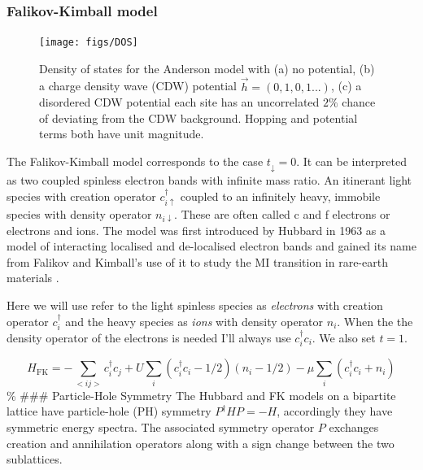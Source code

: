 \hypertarget{falikov-kimball-model}{%
\subsubsection{Falikov-Kimball model}\label{falikov-kimball-model}}

\begin{figure}
  \centering
    \texttt{[image: figs/DOS]}
  \caption{Density of states for the Anderson model with (a) no potential, (b) a charge density wave (CDW) potential $\vec{h} = (0,1,0,1...)$, (c) a disordered CDW potential each site has an uncorrelated $2\%$ chance of deviating from the CDW background. Hopping and potential terms both have unit magnitude.}
  \label{fig:fk_dos}
\end{figure}

The Falikov-Kimball model corresponds to the case \(t_{\downarrow} = 0\). It can be interpreted as two coupled spinless electron bands with infinite mass ratio. An itinerant light species with creation operator \(c^\dagger_{i\uparrow}\) coupled to an infinitely heavy, immobile species with density operator \(n_{i\downarrow}\). These are often called c and f electrons or electrons and ions. The model was first introduced by Hubbard in 1963 as a model of interacting localised and de-localised electron bands and gained its name from Falikov and Kimball's use of it to study the MI transition in rare-earth materials \autocite{hubbardj.ElectronCorrelationsNarrow1963,falicov_simple_1969}.

Here we will use refer to the light spinless species as \emph{electrons} with creation operator \(c^\dagger_{i}\) and the heavy species as \emph{ions} with density operator \(n_i\). When the the density operator of the electrons is needed I'll always use \(c^\dagger_{i}c_{i}\). We also set \(t = 1\).

\[
    H_{\mathrm{FK}} = -\sum_{<ij>} c^\dagger_{i}c_{j} + U \sum_{i} (c^\dagger_{i}c_{i} - 1/2)( n_i - 1/2) - \mu \sum_i \left(c^\dagger_{i}c_{i} + n_{i}\right)
\] \% \#\#\# Particle-Hole Symmetry The Hubbard and FK models on a bipartite lattice have particle-hole (PH) symmetry \(P^\dagger H P = - H\), accordingly they have symmetric energy spectra. The associated symmetry operator \(P\) exchanges creation and annihilation operators along with a sign change between the two sublattices.

